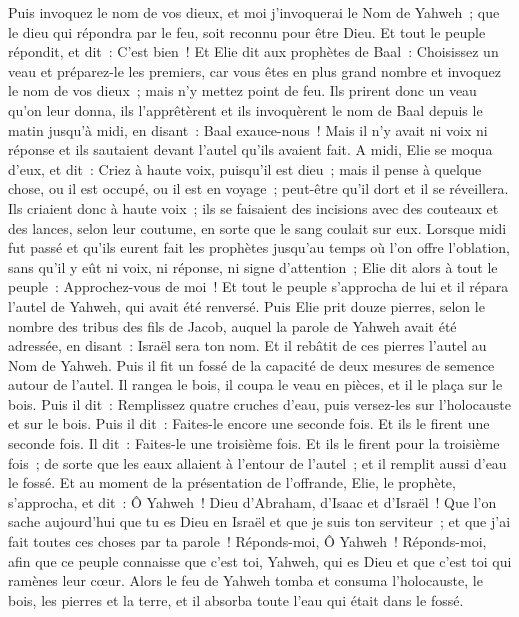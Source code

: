 \begin{multicols}{2}
Puis invoquez le nom de vos dieux, et moi j'invoquerai le Nom de Yahweh~; que le dieu qui répondra par le feu, soit reconnu pour être Dieu. Et tout le peuple répondit, et dit~: C'est bien~!
Et Elie dit aux prophètes de Baal~: Choisissez un veau et préparez-le les premiers, car vous êtes en plus grand nombre et invoquez le nom de vos dieux~; mais n'y mettez point de feu.
Ils prirent donc un veau qu'on leur donna, ils l'apprêtèrent et ils invoquèrent le nom de Baal depuis le matin jusqu'à midi, en disant~: Baal exauce-nous~! Mais il n'y avait ni voix ni réponse et ils sautaient devant l'autel qu'ils avaient fait.
A midi, Elie se moqua d'eux, et dit~: Criez à haute voix, puisqu'il est dieu~; mais il pense à quelque chose, ou il est occupé, ou il est en voyage~; peut-être qu'il dort et il se réveillera.
Ils criaient donc à haute voix~; ils se faisaient des incisions avec des couteaux et des lances, selon leur coutume, en sorte que le sang coulait sur eux.
Lorsque midi fut passé et qu'ils eurent fait les prophètes jusqu'au temps où l'on offre l'oblation, sans qu'il y eût ni voix, ni réponse, ni signe d'attention~;
Elie dit alors à tout le peuple~: Approchez-vous de moi~! Et tout le peuple s'approcha de lui et il répara l'autel de Yahweh, qui avait été renversé.
Puis Elie prit douze pierres, selon le nombre des tribus des fils de Jacob, auquel la parole de Yahweh avait été adressée, en disant~: Israël sera ton nom.
Et il rebâtit de ces pierres l'autel au Nom de Yahweh. Puis il fit un fossé de la capacité de deux mesures de semence autour de l'autel.
Il rangea le bois, il coupa le veau en pièces, et il le plaça sur le bois.
Puis il dit~: Remplissez quatre cruches d'eau, puis versez-les sur l'holocauste et sur le bois. Puis il dit~: Faites-le encore une seconde fois. Et ils le firent une seconde fois. Il dit~: Faites-le une troisième fois. Et ils le firent pour la troisième fois~;
de sorte que les eaux allaient à l'entour de l'autel~; et il remplit aussi d'eau le fossé.
Et au moment de la présentation de l'offrande, Elie, le prophète, s'approcha, et dit~: Ô Yahweh~! Dieu d'Abraham, d'Isaac et d'Israël~! Que l'on sache aujourd'hui que tu es Dieu en Israël et que je suis ton serviteur~; et que j'ai fait toutes ces choses par ta parole~!
Réponds-moi, Ô Yahweh~! Réponds-moi, afin que ce peuple connaisse que c'est toi, Yahweh, qui es Dieu et que c'est toi qui ramènes leur cœur.
Alors le feu de Yahweh tomba et consuma l'holocauste, le bois, les pierres et la terre, et il absorba toute l'eau qui était dans le fossé.

\end{multicols}

